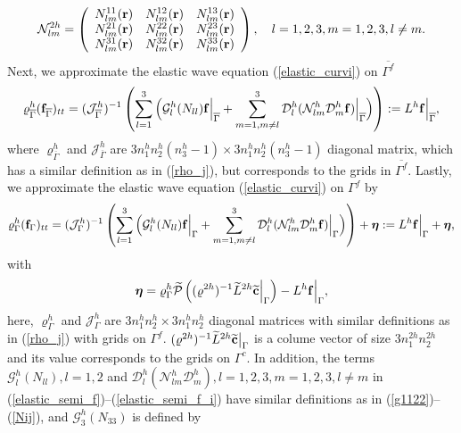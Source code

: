 \begin{align}\label{Nij}
\mathcal{N}_{lm}^{2h}= \left(\begin{array}{ccc}
N_{lm}^{11}({\bf r})&N_{lm}^{12}({\bf r}) & N_{lm}^{13}({\bf r})\\
N_{lm}^{21}({\bf r})& N_{lm}^{22}({\bf r}) &  N_{lm}^{23}({\bf r})\\
N_{lm}^{31}({\bf r})& N_{lm}^{32}({\bf r}) &  N_{lm}^{33}({\bf r})\\ \end{array}\right),\ \ \ l = 1,2,3, m = 1,2,3, l\neq m.
\end{align}
Next, we approximate the elastic wave equation (\ref{elastic_curvi}) on $\overline{\Gamma^f}$ 
\begin{equation}\label{elastic_semi_f}
\varrho^h_{\overline{\Gamma}} ({\bf f}_{\overline{\Gamma}})_{tt} =
( \mathcal{ J}_{\overline{\Gamma}}^{h})^{-1}\left(\sum_{l=1}^3\Big(\mathcal{G}_l^{h}({N}_{ll}){\bf f}\Big|_{\overline{\Gamma}}+\sum_{m=1,m\neq l}^3\mathcal{D}_l^{h}(\mathcal{N}_{lm}^{h}\mathcal{D}_m^{h}{\bf f})\Big|_{\overline{\Gamma}}\Big)\right) := L^h{\bf f}\Big|_{\overline{\Gamma}},
\end{equation}
where ${\varrho}^{h}_{\overline{\Gamma}}$ and ${\mathcal{J}}^{h}_{\overline{\Gamma}}$ are $3n_1^hn_2^h(n_3^h-1)\times 3n_1^hn_2^h(n_3^h-1)$ diagonal matrix, which has a similar definition as in (\ref{rho_j}), but corresponds to the grids in $\overline{\Gamma^f}$. Lastly, we approximate the elastic wave equation (\ref{elastic_curvi}) on $\Gamma^f$ by
\begin{equation}\label{elastic_semi_f_i}
{\varrho}^h_\Gamma ({\bf f}_\Gamma)_{tt} =
( {\mathcal{ J}}^{h}_\Gamma)^{-1}\left(\sum_{l=1}^3\Big(\mathcal{G}_l^{h}({N}_{ll}){\bf f}\Big|_\Gamma+\sum_{m=1,m\neq l}^3\mathcal{D}_l^{h}(\mathcal{N}_{lm}^{h}\mathcal{D}_m^{h}{\bf f})\Big|_\Gamma\Big) \right) + {\bm \eta} := L^h{\bf f}\Big|_\Gamma + {\bm \eta},
\end{equation}
with 
\begin{equation}\label{eta}
{\bm \eta} = {\varrho}^h_{\Gamma}\wt{\mathcal{P}}\left(({ \varrho}^{2h})^{-1}\wt{L}^{2h} \wt{{\bf c}}\Big|_{\Gamma}\right) - L^{h}{\bf f}\Big|_{\Gamma},
\end{equation}
here, ${\varrho}^{h}_{\Gamma}$ and ${\mathcal{ J}}^{h}_{\Gamma}$ are $3n_1^hn_2^h\times 3n_1^hn_2^h$ diagonal matrices with similar definitions as in (\ref{rho_j}) with grids on $\Gamma^f$. $({\varrho}^{2h})^{-1}\widetilde{L}^{2h} \widetilde{{\bf c}}\big|_{\Gamma}$ is a colume vector of size $3n_1^{2h} n_2^{2h}$ and its value corresponds to the grids on $\Gamma^c$. In addition, the terms $\mathcal{G}_l^h({N}_{ll}), l = 1,2$ and $\mathcal{D}_l^h(\mathcal{N}_{lm}^h\mathcal{D}_m^h), l=1,2,3,m=1,2,3,l\neq m$ in (\ref{elastic_semi_f})--(\ref{elastic_semi_f_i}) have similar definitions as in (\ref{g1122})--(\ref{Nij}), and $\mathcal{G}_3^h({N}_{33})$ is defined by
